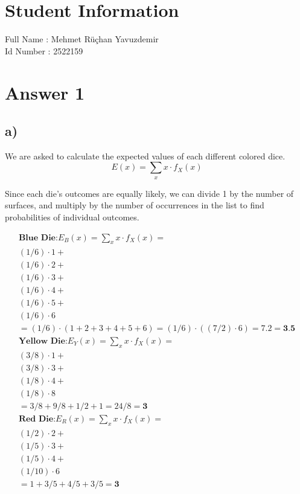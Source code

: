 \documentclass[12pt]{article}
\begin{document}
\section*{Student Information } 

Full Name :  Mehmet Rüçhan Yavuzdemir \\
Id Number : 2522159 \\

\section*{Answer 1}


\subsection*{a)} 

We are asked to calculate the expected values of each different colored dice.
\begin{equation*}
    E(x) = \sum\limits_{x} x \cdot f_X(x) 
\end{equation*}

Since each die's outcomes are equally likely, we can divide 1 by the number of surfaces, and multiply by the number of occurrences in the list to find probabilities of individual outcomes.

\begin{align*}

\textbf{Blue Die:}

    E_B(x) = \sum\limits_{x} x \cdot f_X(x) = \\
    (1/6) \cdot 1 + \\
    (1/6) \cdot 2 + \\
    (1/6) \cdot 3 + \\
    (1/6) \cdot 4 + \\
    (1/6) \cdot 5 + \\
    (1/6) \cdot 6 \\
    = (1/6) \cdot (1+2+3+4+5+6) = (1/6) \cdot ((7/2)\cdot 6) = 7.2 = \textbf{3.5} \\

\textbf{Yellow Die:}
E_Y(x) = \sum\limits_{x} x \cdot f_X(x) = \\
    (3/8) \cdot 1 + \\
    (3/8) \cdot 3 + \\
    (1/8) \cdot 4 + \\
    (1/8) \cdot 8 \\
    = 3/8 + 9/8 + 1/2 + 1 = 24/8 = \textbf{3} \\

\textbf{Red Die:}
E_R(x) = \sum\limits_{x} x \cdot f_X(x) = \\
    (1/2) \cdot 2 + \\
    (1/5) \cdot 3 + \\
    (1/5) \cdot 4 + \\
    (1/10) \cdot 6 \\
    = 1 + 3/5 + 4/5 + 3/5 = \textbf{3} \\
    
\end{align*}
\end{document}
